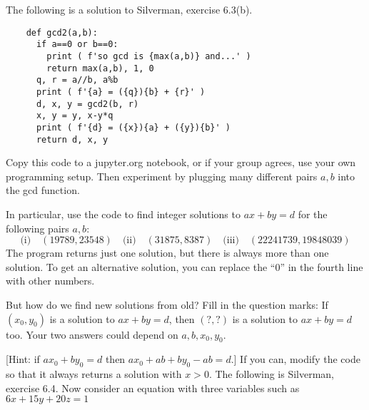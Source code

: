 \documentclass[12pt]{exam}
\begin{document}
\begin{questions}
  \question The following is a solution to Silverman, exercise 6.3(b).
  \begin{lstlisting}
    def gcd2(a,b):
      if a==0 or b==0:
        print ( f'so gcd is {max(a,b)} and...' )
        return max(a,b), 1, 0
      q, r = a//b, a%b
      print ( f'{a} = ({q}){b} + {r}' )
      d, x, y = gcd2(b, r)
      x, y = y, x-y*q
      print ( f'{d} = ({x}){a} + ({y}){b}' )
      return d, x, y
  \end{lstlisting}
  Copy this code to a jupyter.org notebook, or if your group agrees, use your own programming setup. Then experiment by plugging many different pairs $a,b$ into the gcd function.

  In particular, use the code to find integer solutions to $ax+by=d$ for the following pairs $a,b$:
  \[\text{(i)}\quad(19789, 23548)\quad
  \text{(ii)}\quad(31875, 8387)\quad
  \text{(iii)}\quad(22241739, 19848039)
    \]
  \vspace{.75in}
  \question The program returns just one solution, but there is always more than one solution. To get an alternative solution, you can replace the ``$0$'' in the fourth line with other numbers.
  
   But how do we find new solutions from old? Fill in the question marks: If $(x_0,y_0)$ is a solution to $ax+by=d$, then $(?,?)$ is a solution to $ax+by=d$ too. Your two answers could depend on $a,b,x_0,y_0$.

  [Hint: if $ax_0+by_0=d$ then $ax_0+ab+by_0-ab=d$.]
  \vspace{\fill}
  \question If you can, modify the code so that it always returns a solution with $x>0$.
  \newpage
  \question The following is Silverman, exercise 6.4. Now consider an equation with three variables such as $6x+15y+20z=1$
\end{questions}
\end{document}
